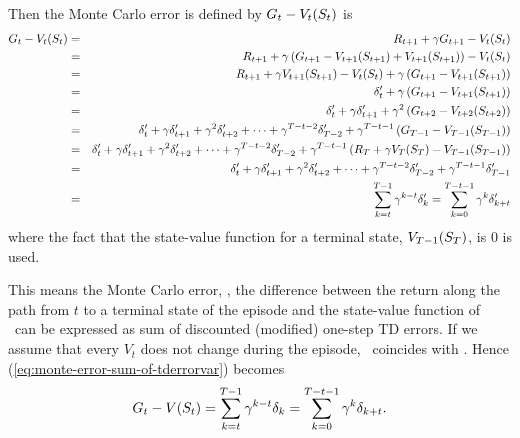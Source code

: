 Then the Monte Carlo error is defined by $G_{{t}} - V_t(S_{t})$ is
\begin{eqnarray}
G_{{t}} - V_t(S_{t})
&=& R_{t+1} + \gamma G_{{t+1}} - V_t(S_{t})
\nonumber
\\
&=& R_{t+1} + \gamma \left( G_{{t+1}} - V_{t+1}(S_{t+1}) + V_{t+1}(S_{t+1}) \right) - V_t(S_{t})
\nonumber
\\
&=& R_{t+1} + \gamma V_{t+1}(S_{t+1}) - V_t(S_{t}) + \gamma \left( G_{{t+1}} - V_{t+1}(S_{t+1})\right)
\nonumber
\\
&=& \delta'_{t} + \gamma \left( G_{{t+1}} - V_{t+1}(S_{t+1})\right)
\nonumber
\\
&=& \delta'_{t} + \gamma \delta'_{t+1} + \gamma^2 \left( G_{{t+2}} - V_{t+2}(S_{t+2})\right)
\nonumber
\\
&=& \delta'_{t} + \gamma \delta'_{t+1} + \gamma^2 \delta'_{t+2} + \cdots
+ \gamma^{T-t-2} \delta'_{T-2} + \gamma^{T-t-1} \left( G_{{T-1}} - V_{T-1}(S_{T-1})\right)
\nonumber
\\
&=& \delta'_{t} + \gamma \delta'_{t+1} + \gamma^2 \delta'_{t+2} + \cdots
+ \gamma^{T-t-2} \delta'_{T-2} + \gamma^{T-t-1} \left( R_{T} + \gamma V_{T}(S_{T}) - V_{T-1}(S_{T-1})\right)
\nonumber
\\
&=& \delta'_{t} + \gamma \delta'_{t+1} + \gamma^2 \delta'_{t+2} + \cdots
+ \gamma^{T-t-2} \delta'_{T-2} + \gamma^{T-t-1} \delta'_{T-1}
\nonumber
\\
&=& \sum_{k=t}^{T-1} \gamma^{k-t} \delta'_{k}
= \sum_{k=0}^{T-t-1} \gamma^{k} \delta'_{k+t}
\label{eq:monte-error-sum-of-tderrorvar}
\end{eqnarray}
where the fact that the state-value function for a terminal state, $V_{T-1}(S_{T})$, is $0$ is used.

This means the Monte Carlo error, \ie, the difference between the return along the path from $t$ to a terminal state of the episode
and the state-value function of \ can be expressed as sum of discounted (modified) one-step TD errors.
If we assume that every $V_t$ does not change during the episode, \ coincides with .
Hence (\ref{eq:monte-error-sum-of-tderrorvar}) becomes
\begin{equation}
\label{eq:monte-error-sum-of-tderror}
G_{{t}} - V(S_{t})
= \sum_{k=t}^{T-1} \gamma^{k-t} \delta_{k}
= \sum_{k=0}^{T-t-1} \gamma^{k} \delta_{k+t}.
\end{equation}



